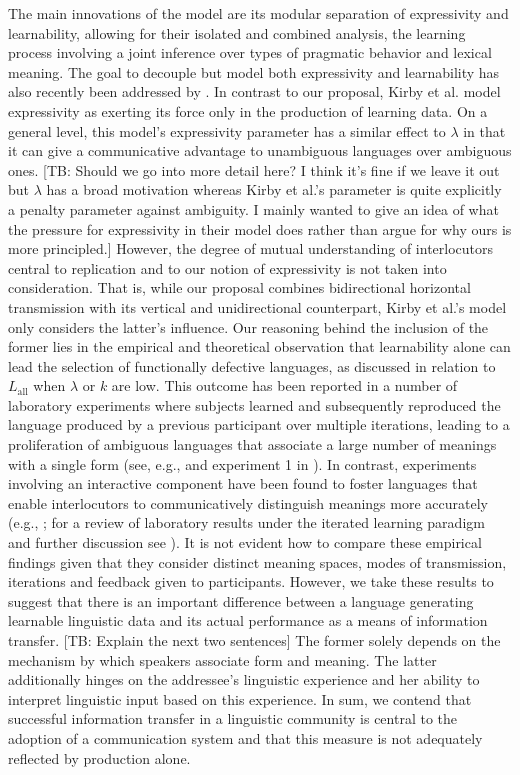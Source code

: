 \documentclass[a4paper]{article}
\newcommand{\tb}[1]{\textcolor[rgb]{.8,.33,.0}{[TB: #1]}}%
\newcommand{\mylang}[1]{\ensuremath{L_{\text{#1}}}\xspace} %
\newcommand{\Lall}{\mylang{all}}
\begin{document}
The main innovations of the model are its modular separation of expressivity and learnability, allowing for their isolated and combined analysis, the learning process involving a joint inference over types of pragmatic behavior and lexical meaning. The goal to decouple but model both expressivity and learnability has also recently been addressed by \citet{kirby+etal:2015}. In contrast to our proposal, Kirby et al. model expressivity as exerting its force only in the production of learning data. On a general level, this model's expressivity parameter has a similar effect to $\lambda$ in that it can give a communicative advantage to unambiguous languages over ambiguous ones. \tb{Should we go into more detail here? I think it's fine if we leave it out but $\lambda$ has a broad motivation whereas Kirby et al.'s parameter is quite explicitly a penalty parameter against ambiguity. I mainly wanted to give an idea of what the pressure for expressivity in their model does rather than argue for why ours is more principled.} However, the degree of mutual understanding of interlocutors central to replication and to our notion of expressivity is not taken into consideration. That is, while our proposal combines bidirectional horizontal transmission with its vertical and unidirectional counterpart, Kirby et al.'s model only considers the latter's influence. Our reasoning behind the inclusion of the former lies in the empirical and theoretical observation that learnability alone can lead the selection of functionally defective languages, as discussed in relation to $\Lall$ when $\lambda$ or $k$ are low. This outcome has been reported in a number of laboratory experiments where subjects learned and subsequently reproduced the language produced by a previous participant over multiple iterations, leading to a proliferation of ambiguous languages that associate a large number of meanings with a single form (see, e.g., \citealt{silvey+etal:2014} and experiment 1 in \citealt{kirby+etal:2008}). In contrast, experiments involving an interactive component have been found to foster languages that enable interlocutors to communicatively distinguish meanings more accurately  (e.g., \citealt{fay+etal:2013}; for a review of laboratory results under the iterated learning paradigm and further discussion see \citealt{kirby+etal:2015, tamariz+kirby:2016}). It is not evident how to compare these empirical findings given that they consider distinct meaning spaces, modes of transmission, iterations and feedback given to participants. However, we take these results to suggest that there is an important difference between a language generating learnable linguistic data and its actual performance as a means of information transfer. \tb{Explain the next two sentences} The former solely depends on the mechanism by which speakers associate form and meaning. The latter additionally hinges on the addressee's linguistic experience and her ability to interpret linguistic input based on this experience. In sum, we contend that successful information transfer in a linguistic community is central to the adoption of a communication system and that this measure is not adequately reflected by production alone.
\end{document}
